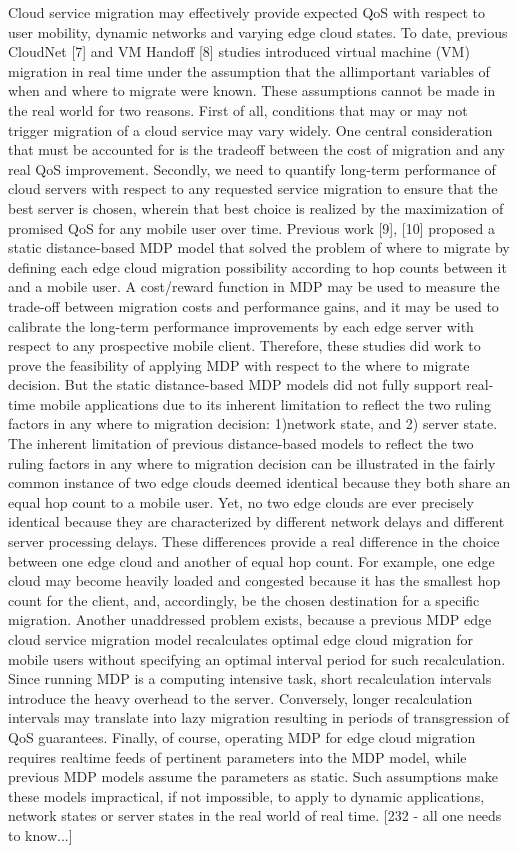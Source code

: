 Cloud service migration may effectively provide expected
QoS with respect to user mobility, dynamic networks and
varying edge cloud states. To date, previous CloudNet [7]
and VM Handoff [8] studies introduced virtual machine (VM)
migration in real time under the assumption that the allimportant
variables of when and where to migrate were known.
These assumptions cannot be made in the real world for
two reasons. First of all, conditions that may or may not
trigger migration of a cloud service may vary widely. One
central consideration that must be accounted for is the tradeoff
between the cost of migration and any real QoS improvement.
Secondly, we need to quantify long-term performance of cloud
servers with respect to any requested service migration to
ensure that the best server is chosen, wherein that best choice
is realized by the maximization of promised QoS for any
mobile user over time.
Previous work [9], [10] proposed a static distance-based
MDP model that solved the problem of where to migrate
by defining each edge cloud migration possibility according
to hop counts between it and a mobile user. A cost/reward
function in MDP may be used to measure the trade-off
between migration costs and performance gains, and it may
be used to calibrate the long-term performance improvements
by each edge server with respect to any prospective mobile
client. Therefore, these studies did work to prove the feasibility
of applying MDP with respect to the where to migrate
decision. But the static distance-based MDP models did not
fully support real-time mobile applications due to its inherent
limitation to reflect the two ruling factors in any where to
migration decision: 1)network state, and 2) server state.
The inherent limitation of previous distance-based models
to reflect the two ruling factors in any where to migration decision
can be illustrated in the fairly common instance of two
edge clouds deemed identical because they both share an equal
hop count to a mobile user. Yet, no two edge clouds are ever
precisely identical because they are characterized by different
network delays and different server processing delays. These
differences provide a real difference in the choice between
one edge cloud and another of equal hop count. For example,
one edge cloud may become heavily loaded and congested
because it has the smallest hop count for the client, and,
accordingly, be the chosen destination for a specific migration.
Another unaddressed problem exists, because a previous MDP
edge cloud service migration model recalculates optimal edge
cloud migration for mobile users without specifying an optimal
interval period for such recalculation. Since running MDP
is a computing intensive task, short recalculation intervals
introduce the heavy overhead to the server. Conversely, longer
recalculation intervals may translate into lazy migration resulting
in periods of transgression of QoS guarantees. Finally, of
course, operating MDP for edge cloud migration requires realtime
feeds of pertinent parameters into the MDP model, while
previous MDP models assume the parameters as static. Such
assumptions make these models impractical, if not impossible,
to apply to dynamic applications, network states or server
states in the real world of real time.
[232 - all one needs to know...]


